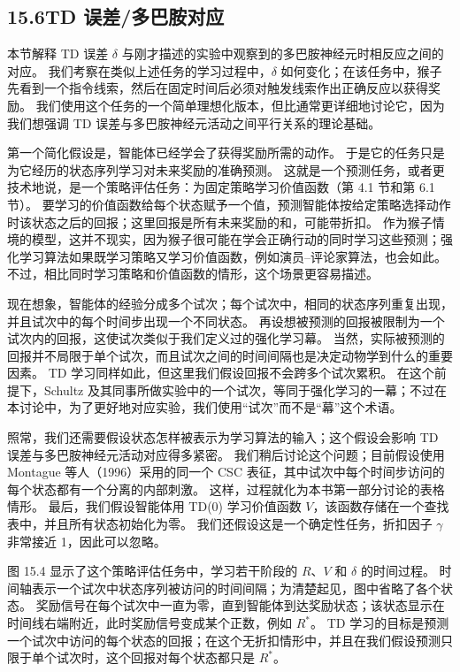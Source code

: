 \documentclass[UTF8, 12pt, fontset=fandol, oneside]{ctexart}
\begin{document}
\subsection*{15.6\quad TD 误差/多巴胺对应}

本节解释 TD 误差 $\delta$ 与刚才描述的实验中观察到的多巴胺神经元时相反应之间的对应。
我们考察在类似上述任务的学习过程中，$\delta$ 如何变化；在该任务中，猴子先看到一个指令线索，然后在固定时间后必须对触发线索作出正确反应以获得奖励。
我们使用这个任务的一个简单理想化版本，但比通常更详细地讨论它，因为我们想强调 TD 误差与多巴胺神经元活动之间平行关系的理论基础。

第一个简化假设是，智能体已经学会了获得奖励所需的动作。
于是它的任务只是为它经历的状态序列学习对未来奖励的准确预测。
这就是一个预测任务，或者更技术地说，是一个策略评估任务：为固定策略学习价值函数（第 4.1 节和第 6.1 节）。
要学习的价值函数给每个状态赋予一个值，预测智能体按给定策略选择动作时该状态之后的回报；这里回报是所有未来奖励的和，可能带折扣。
作为猴子情境的模型，这并不现实，因为猴子很可能在学会正确行动的同时学习这些预测；强化学习算法如果既学习策略又学习价值函数，例如演员--评论家算法，也会如此。
不过，相比同时学习策略和价值函数的情形，这个场景更容易描述。

现在想象，智能体的经验分成多个试次；每个试次中，相同的状态序列重复出现，并且试次中的每个时间步出现一个不同状态。
再设想被预测的回报被限制为一个试次内的回报，这使试次类似于我们定义过的强化学习幕。
当然，实际被预测的回报并不局限于单个试次，而且试次之间的时间间隔也是决定动物学到什么的重要因素。
TD 学习同样如此，但这里我们假设回报不会跨多个试次累积。
在这个前提下，Schultz 及其同事所做实验中的一个试次，等同于强化学习的一幕；不过在本讨论中，为了更好地对应实验，我们使用“试次”而不是“幕”这个术语。

照常，我们还需要假设状态怎样被表示为学习算法的输入；这个假设会影响 TD 误差与多巴胺神经元活动对应得多紧密。
我们稍后讨论这个问题；目前假设使用 Montague 等人（1996）采用的同一个 CSC 表征，其中试次中每个时间步访问的每个状态都有一个分离的内部刺激。
这样，过程就化为本书第一部分讨论的表格情形。
最后，我们假设智能体用 TD(0) 学习价值函数 $V$，该函数存储在一个查找表中，并且所有状态初始化为零。
我们还假设这是一个确定性任务，折扣因子 $\gamma$ 非常接近 1，因此可以忽略。

图 15.4 显示了这个策略评估任务中，学习若干阶段的 $R$、$V$ 和 $\delta$ 的时间过程。
时间轴表示一个试次中状态序列被访问的时间间隔；为清楚起见，图中省略了各个状态。
奖励信号在每个试次中一直为零，直到智能体到达奖励状态；该状态显示在时间线右端附近，此时奖励信号变成某个正数，例如 $R^*$。
TD 学习的目标是预测一个试次中访问的每个状态的回报；在这个无折扣情形中，并且在我们假设预测只限于单个试次时，这个回报对每个状态都只是 $R^*$。
\end{document}

